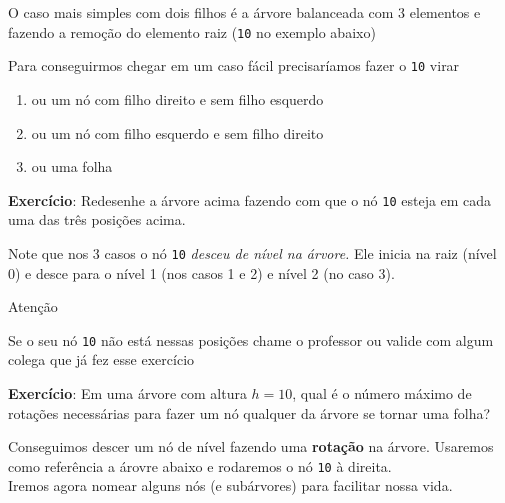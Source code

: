 \documentclass[]{article}
\providecommand{\tightlist}{%
  \setlength{\itemsep}{0pt}\setlength{\parskip}{0pt}}
\begin{document}
\begin{adjustwidth}{0pt}{10em}
O caso mais simples com dois filhos é a árvore balanceada com 3
elementos e fazendo a remoção do elemento raiz (\texttt{10} no exemplo
abaixo)

\hfill{}

Para conseguirmos chegar em um caso fácil precisaríamos fazer o
\texttt{10} virar

\begin{enumerate}
\def\labelenumi{\arabic{enumi}.}
\tightlist
\item
  ou um nó com filho direito e sem filho esquerdo
\item
  ou um nó com filho esquerdo e sem filho direito
\item
  ou uma folha
\end{enumerate}

\textbf{Exercício}: Redesenhe a árvore acima fazendo com que o nó
\texttt{10} esteja em cada uma das três posições acima.

\vspace{15em}

Note que nos 3 casos o nó \texttt{10} \emph{desceu de nível na árvore.}
Ele inicia na raiz (nível 0) e desce para o nível 1 (nos casos 1 e 2) e
nível 2 (no caso 3).

\begin{boxYellow}{Atenção}

Se o seu nó \texttt{10} não está nessas posições chame o professor ou
valide com algum colega que já fez esse exercício

\end{boxYellow}

\textbf{Exercício}: Em uma árvore com altura \(h = 10\), qual é o número
máximo de rotações necessárias para fazer um nó qualquer da árvore se
tornar uma folha?

\vspace{1em}

Conseguimos descer um nó de nível fazendo uma \textbf{rotação} na
árvore. Usaremos como referência a árovre abaixo e rodaremos o nó
\texttt{10} à direita.\\
Iremos agora nomear alguns nós (e subárvores) para facilitar nossa vida.

\hfill{}
\end{adjustwidth}
\end{document}
